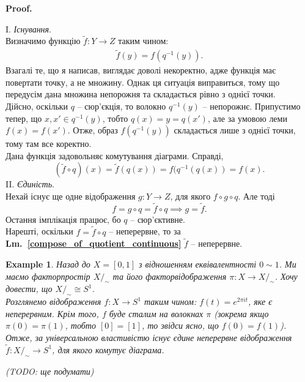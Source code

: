 \documentclass[a4paper, 10pt]{article}
\makeatletter
\theoremstyle{theoremdd}
\newtheorem{example}[theorem]{Example}
\newcommand\lmref[1]{\textbf{Lm.~\ref{#1}}}
\renewenvironment{proof}[1][Proof.\\]{\par
\pushQED{\hfill \qed}%
\normalfont \topsep6\p@\@plus6\p@\relax
\trivlist
\item\relax
{\bfseries
#1\@addpunct{.}}\hspace\labelsep\ignorespaces
}{%
\popQED\endtrivlist\@endpefalse
}
\makeatother
\begin{document}
\begin{proof}
I. \textit{Існування}.\\
Визначимо функцію $\tilde{f} \colon Y \to Z$ таким чином:
\begin{align*}
\tilde{f}(y) = f(q^{-1}(y)).
\end{align*}
Взагалі те, що я написав, виглядає доволі некоректно, адже функція має повертати точку, а не множину. Однак ця ситуація виправиться, тому що передусім дана множина непорожня та складається рівно з однієї точки.\\
Дійсно, оскільки $q$ -- сюр'єкція, то волокно $q^{-1}(y)$ -- непорожнє. Припустимо тепер, що $x,x' \in q^{-1}(y)$, тобто $q(x) = y = q(x')$, але за умовою леми $f(x) = f(x')$. Отже, образ $f(q^{-1}(y))$ складається лише з однієї точки, тому там все коректно.\\
Дана функція задовольняє комутування діаграми. Справді,
\[
(\tilde{f} \circ q)(x) = \tilde{f}(q(x)) = f(q^{-1}(q(x)) = f(x).
\]
II. \textit{Єдиність}.\\
Нехай існує ще одне відображення $g \colon Y \to Z$, для якого $f \circ g \circ q$. Але тоді
\[
f = g \circ q = \tilde{f} \circ q \implies g = \tilde{f}.
\]
Остання імплікація працює, бо $q$ -- сюр'єктивне.\\
Нарешті, оскільки $f = \tilde{f} \circ q$ -- неперервне, то за \lmref{compose_of_quotient_continuous} $\tilde{f}$ -- неперервне. 
\end{proof}

\begin{example}
Назад до $X = [0,1]$ з відношенням еквівалентності $0 \sim 1$. Ми маємо факторпростір $X/_\sim$ та його факторвідображення $\pi \colon X \to X/_\sim$. Хочу довести, що $X/_\sim \cong S^1$.\\
Розглянемо відображення $f \colon X \to S^1$ таким чином: $f(t) = e^{2\pi i t}$, яке є неперервним. Крім того, $f$ буде сталим на волокнах $\pi$ (зокрема якщо $\pi(0) = \pi(1)$, тобто $[0] = [1]$, то звідси ясно, що $f(0) = f(1)$). Отже, за універсальною властивістю існує єдине неперервне відображення $\tilde{f} \colon X/_\sim \to S^1$, для якого комутує діаграма.
\begin{figure}[H]
\centering
{}
\end{figure}
(TODO: ще подумати)
\end{example}
\end{document}
